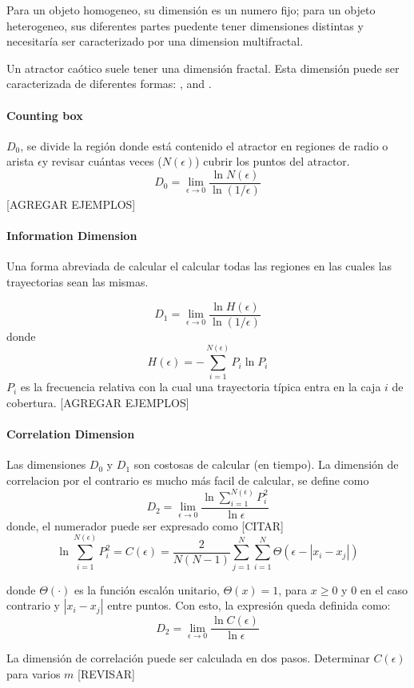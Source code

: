 \documentclass[12pt]{book}
\begin{document}
Para un objeto homogeneo, su dimensión es un numero fijo;
para un objeto heterogeneo, sus diferentes partes puedente tener dimensiones
distintas y necesitaría ser caracterizado por una dimension multifractal.

Un atractor caótico suele tener una dimensión fractal. Esta dimensión puede ser
caracterizada de diferentes formas: ,  and .

\newcommand{\e}{\ensuremath{\epsilon}}
\paragraph{Counting box} $D_0$, se divide la región donde está contenido el
atractor en regiones de radio o arista \e y revisar cuántas veces ($N(\e)$)
cubrir los puntos del atractor. 
$$
	D_0 = \lim_{\e \rightarrow 0} \frac{\ln N(\e)}{\ln(1/\e)}
$$
[AGREGAR EJEMPLOS]

\paragraph{Information Dimension} Una forma abreviada de calcular el  calcular todas las regiones
en las cuales las trayectorias sean las mismas.

$$
	D_1 = \lim_{\e \rightarrow 0} \frac{\ln H(\e)}{\ln(1/\e)}
$$
donde
$$
	H(\e) = - \sum_{i=1}^{N(\e)} P_i \ln P_i
$$
$P_i$ es la frecuencia relativa con la cual una trayectoria típica entra en la
caja $i$ de cobertura.
[AGREGAR EJEMPLOS]

\paragraph{Correlation Dimension} Las dimensiones $D_0$ y $D_1$ son costosas de calcular (en tiempo). 
La dimensión de correlacion por el contrario es mucho más facil de calcular, se
define como
$$
	D_2 = \lim_{\e \rightarrow 0} \frac{\ln \sum_{i=1}^{N(\e)} P_i^2}{\ln \e }
$$
donde, el numerador puede ser expresado como [CITAR]
$$
\ln \sum_{i=1}^{N(\e)} P_i^2 = C(\epsilon) =
\frac{2}{N(N-1)}\sum_{j=1}^{N}\sum_{i=1}^{N} \Theta(\e - |x_i - x_j|)
$$

donde $\Theta(\cdot)$ es la función escalón unitario, $\Theta(x) = 1$, para $x
\geq 0$ y $0$ en el caso contrario y $|x_i -x_j|$ entre puntos. Con esto, la
expresión queda definida como:
$$
	D_2 = \lim_{\e \rightarrow 0} \frac{\ln C(\e)}{\ln \e}
$$

La dimensión de correlación puede ser calculada en dos pasos. 
Determinar $C(\e)$ para varios $m$ [REVISAR]
\end{document}
